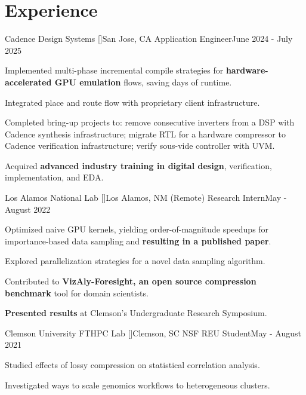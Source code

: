 \section{\textbf{Experience}}
\vspace{-0.4mm}
\resumeSubHeadingListStart

\resumeSubheading
{Cadence Design Systems [\href{https://www.cadence.com/en_US/home.html}{}]}{San Jose, CA}
{Application Engineer}{June 2024 - July 2025}
\resumeItemListStart
    \item Implemented multi-phase incremental compile strategies for \textbf{hardware-accelerated GPU emulation} flows, saving days of runtime.
    \item Integrated place and route flow with proprietary client infrastructure.
    \item Completed bring-up projects to: remove consecutive inverters from a DSP with Cadence synthesis infrastructure; migrate RTL for a hardware compressor to Cadence verification infrastructure; verify sous-vide controller with UVM.
    \item Acquired \textbf{advanced industry training in digital design}, verification, implementation, and EDA.
\resumeItemListEnd 


\resumeSubheading
{Los Alamos National Lab [\href{https://www.lanl.gov}{}]}{Los Alamos, NM (Remote)}
{Research Intern}{May - August 2022}
\resumeItemListStart
    \item Optimized naive GPU kernels, yielding order-of-magnitude speedups for importance-based data sampling and \textbf{resulting in a published paper}.
    \item Explored parallelization strategies for a novel data sampling algorithm.
    \item Contributed to \textbf{VizAly-Foresight, an open source compression benchmark} tool for domain scientists.
    \item \textbf{Presented results} at Clemson's Undergraduate Research Symposium.
\resumeItemListEnd

\resumeSubheading
{Clemson University FTHPC Lab [\href{https://jonccal.people.clemson.edu}{}]}{Clemson, SC}
{NSF REU Student}{May - August 2021}
\resumeItemListStart
    \item Studied effects of lossy compression on statistical correlation analysis.
    \item Investigated ways to scale genomics workflows to heterogeneous clusters.
\resumeItemListEnd

